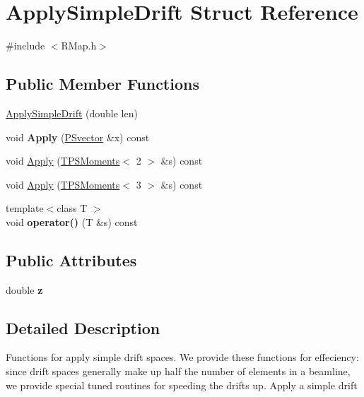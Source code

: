 \hypertarget{structApplySimpleDrift}{}\section{Apply\+Simple\+Drift Struct Reference}
\label{structApplySimpleDrift}


{\ttfamily \#include $<$R\+Map.\+h$>$}

\subsection*{Public Member Functions}
\begin{DoxyCompactItemize}
\item 
\hyperlink{structApplySimpleDrift_aca5ddd8bc2526f0a35aacbfc82818b00}{Apply\+Simple\+Drift} (double len)
\item 
\mbox{\label{structApplySimpleDrift_a06b1721530aea532611860d6032a3d87}} 
void {\bfseries Apply} (\hyperlink{classPSvector}{P\+Svector} \&x) const
\item 
void \hyperlink{structApplySimpleDrift_aaa41aa85b14166594c969a00098104d0}{Apply} (\hyperlink{classTPSMoments}{T\+P\+S\+Moments}$<$ 2 $>$ \&s) const
\item 
void \hyperlink{structApplySimpleDrift_ab0b910607a8ab8646efc7cfde4d14fef}{Apply} (\hyperlink{classTPSMoments}{T\+P\+S\+Moments}$<$ 3 $>$ \&s) const
\item 
\mbox{\label{structApplySimpleDrift_ac10b63d63c6f386c0049c9fa20f6c255}} 
{\footnotesize template$<$class T $>$ }\\void {\bfseries operator()} (T \&s) const
\end{DoxyCompactItemize}
\subsection*{Public Attributes}
\begin{DoxyCompactItemize}
\item 
\mbox{\label{structApplySimpleDrift_ace5778ecb7610ed73c57b4dd32423c09}} 
double {\bfseries z}
\end{DoxyCompactItemize}


\subsection{Detailed Description}
Functions for apply simple drift spaces. We provide these functions for effeciency\+: since drift spaces generally make up half the number of elements in a beamline, we provide special \textquotesingle{}tuned\textquotesingle{} routines for speeding the drifts up. Apply a simple drift 

